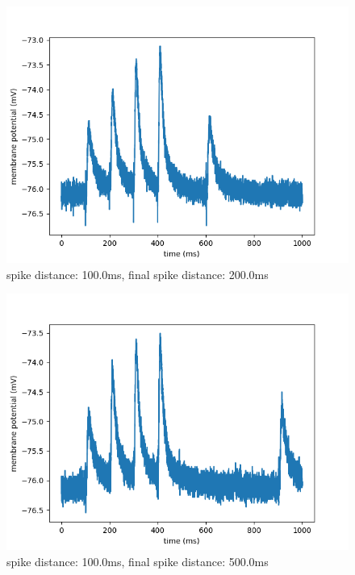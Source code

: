 \documentclass[10pt,a4paper]{scrartcl}
\begin{document}
\newpage

\begin{figure} [ht]
\begin{center}
\label{fig:abb16}
\caption{spike distance: 100.0ms, final spike distance: 200.0ms}
\includegraphics[scale=0.35]{pictures/final_spike_variation_5.pdf} 
\end{center}
\end{figure}


\begin{figure} [ht]
\begin{center}
\label{fig:abb17}
\caption{spike distance: 100.0ms, final spike distance: 500.0ms}
\includegraphics[scale=0.35]{pictures/final_spike_variation_6.pdf} 
\end{center}
\end{figure}
\end{document}
